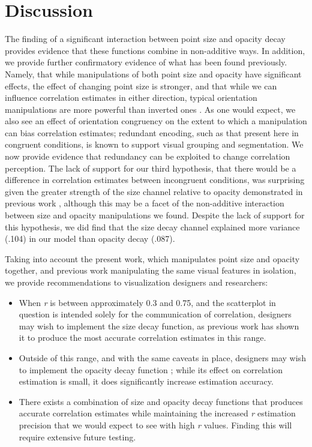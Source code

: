 \documentclass[manuscript, review, anonymous, screen]{acmart}
\providecommand{\tightlist}{%
  \setlength{\itemsep}{0pt}\setlength{\parskip}{0pt}}\usepackage{longtable,booktabs,array}
\begin{document}
\hypertarget{sec-discussion}{%
\section{Discussion}\label{sec-discussion}}

The finding of a significant interaction between point size and opacity
decay provides evidence that these functions combine in non-additive
ways. In addition, we provide further confirmatory evidence of what has
been found previously. Namely, that while manipulations of both point
size and opacity have significant effects, the effect of changing point
size is stronger, and that while we can influence correlation estimates
in either direction, typical orientation manipulations are more powerful
than inverted ones \citep{strain_2023, strain_2023b}. As one would
expect, we also see an effect of orientation congruency on the extent to
which a manipulation can bias correlation estimates; redundant encoding,
such as that present here in congruent conditions, is known to support
visual grouping and segmentation. We now provide evidence that
redundancy can be exploited to change correlation perception. The lack
of support for our third hypothesis, that there would be a difference in
correlation estimates between incongruent conditions, was surprising
given the greater strength of the size channel relative to opacity
demonstrated in previous work
\citep{strain_2023, strain_2023b, hong_2021}, although this may be a
facet of the non-additive interaction between size and opacity
manipulations we found. Despite the lack of support for this hypothesis,
we did find that the size decay channel explained more variance (.104)
in our model than opacity decay (.087).

Taking into account the present work, which manipulates point size and
opacity together, and previous work manipulating the same visual
features in isolation, we provide recommendations to visualization
designers and researchers:

\begin{itemize}
\tightlist
\item
  When \emph{r} is between approximately 0.3 and 0.75, and the
  scatterplot in question is intended solely for the communication of
  correlation, designers may wish to implement the size decay function,
  as previous work \citep{strain_2023b} has shown it to produce the most
  accurate correlation estimates in this range.
\item
  Outside of this range, and with the same caveats in place, designers
  may wish to implement the opacity decay function \citep{strain_2023};
  while its effect on correlation estimation is small, it does
  significantly increase estimation accuracy.
\item
  There exists a combination of size and opacity decay functions that
  produces accurate correlation estimates while maintaining the
  increased \emph{r} estimation precision that we would expect to see
  with high \emph{r} values. Finding this will require extensive future
  testing.
\end{itemize}
\end{document}
